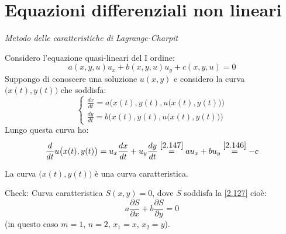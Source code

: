\documentclass[a4paper,11pt]{report}
\begin{document}
\section{Equazioni differenziali non lineari}

\emph{Metodo delle caratteristiche di Lagrange-Charpit}

Considero l'equazione quasi-lineari del I ordine: %
\begin{equation}
a(x,y,u)u_x + b(x,y,u)u_y + c(x,y,u)=0 
\label{2.146}
\end{equation}
Suppongo di conoscere una soluzione $u(x,y)$ e considero la curva $\big(x(t),y(t)\big)$ che soddisfa:
\begin{equation}
\begin{cases}
\frac{dx}{dt}=a \big(x(t),y(t),u \big(x(t),y(t) \big) \big) \\
\frac{dy}{dt}=b \big(x(t),y(t),u \big(x(t),y(t) \big) \big)
\end{cases}
\label{2.147}
\end{equation}
Lungo questa curva ho: 
\begin{equation}
\frac{d}{dt}u\big(x(t),y(t)\big)=u_x \frac{dx}{dt} + u_y\frac{dy}{dt}\overset{\eqref{2.147}}{=}au_x + bu_y \overset{\eqref{2.146}}{=}-c
\label{2.148}
\end{equation}

\medskip

La curva $\big(x(t),y(t)\big)$ \`e una curva caratteristica.

\smallskip

Check: Curva caratteristica $S(x,y)=0$, dove $S$ soddisfa la \eqref{2.127} cio\`e:
\begin{equation}
a\frac{\partial S}{\partial x} + b\frac{\partial S}{\partial y}=0
\label{2.149}
\end{equation}
(in questo caso $m=1$, $n=2$, $x_1=x$, $x_2=y$).
\end{document}
